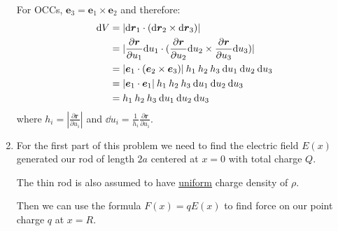 \begin{enumerate}
    For OCCs, $\boldsymbol{e}_3=\boldsymbol{e}_1\times\boldsymbol{e}_2$ and therefore:
    \begin{align*}
    \dd V
    &=|\dd\boldsymbol{r}_1\cdot(\dd\boldsymbol{r}_2\times\dd\boldsymbol{r}_3)| \\
    &=|\frac{\partial\boldsymbol{r}}{\partial u_1}\dd u_1\cdot
    (\frac{\partial\boldsymbol{r}}{\partial u_2}\dd u_2\times
    \frac{\partial\boldsymbol{r}}{\partial u_3}\dd u_3)| \\
    &=|\boldsymbol{e}_1\cdot(\boldsymbol{e}_2\times\boldsymbol{e}_3)|
    \hspace{0.03in}h_1\hspace{0.03in}h_2\hspace{0.03in}h_3\hspace{0.03in}
    \dd u_1\hspace{0.03in}\dd u_2\hspace{0.03in}\dd u_3 \\
    &=|\boldsymbol{e}_1\cdot\boldsymbol{e}_1|
    \hspace{0.03in}h_1\hspace{0.03in}h_2\hspace{0.03in}h_3\hspace{0.03in}
    \dd u_1\hspace{0.03in}\dd u_2\hspace{0.03in}\dd u_3 \\
    &=h_1\hspace{0.03in}h_2\hspace{0.03in}h_3\hspace{0.03in}
    \dd u_1\hspace{0.03in}\dd u_2\hspace{0.03in}\dd u_3
    \end{align*}
    where $h_i=|\displaystyle\frac{\partial\boldsymbol{r}}{\partial u_i}|$
    and $\dd u_i=\displaystyle\frac{1}{h_i}
    \displaystyle\frac{\partial\boldsymbol{r}}{\partial u_i}$.
    \newpage

    \item For the first part of this problem we need to
    find the electric field $E(x)$ generated our rod of length $2a$
    centered at $x=0$ with total charge $Q$.
    
    The thin rod is also assumed to have \underline{uniform} charge density of $\rho$.
    
    Then we can use the formula $F(x)=qE(x)$
    to find force on our point charge $q$ at $x=R$. \\


\end{enumerate}
